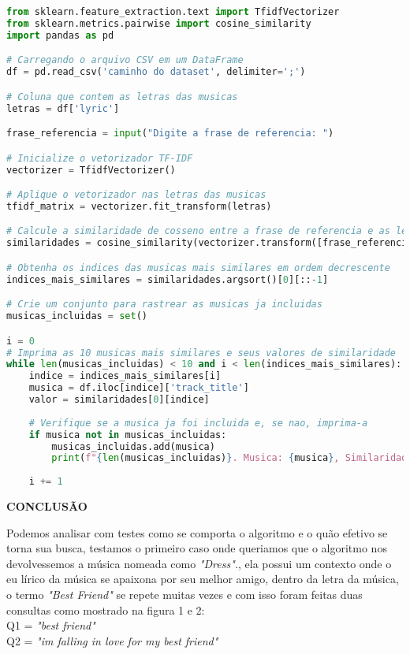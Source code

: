 \documentclass[a4paper,12pt]{article}
\begin{document}
\begin{lstlisting}[language=python, caption=Código referente ao cálculo do Angulo entre Vetores]
from sklearn.feature_extraction.text import TfidfVectorizer
from sklearn.metrics.pairwise import cosine_similarity
import pandas as pd

# Carregando o arquivo CSV em um DataFrame
df = pd.read_csv('caminho do dataset', delimiter=';')

# Coluna que contem as letras das musicas
letras = df['lyric']  

frase_referencia = input("Digite a frase de referencia: ")

# Inicialize o vetorizador TF-IDF
vectorizer = TfidfVectorizer()

# Aplique o vetorizador nas letras das musicas
tfidf_matrix = vectorizer.fit_transform(letras)

# Calcule a similaridade de cosseno entre a frase de referencia e as letras das musicas
similaridades = cosine_similarity(vectorizer.transform([frase_referencia]), tfidf_matrix)

# Obtenha os indices das musicas mais similares em ordem decrescente
indices_mais_similares = similaridades.argsort()[0][::-1]

# Crie um conjunto para rastrear as musicas ja incluidas
musicas_incluidas = set()

i = 0
# Imprima as 10 musicas mais similares e seus valores de similaridade 
while len(musicas_incluidas) < 10 and i < len(indices_mais_similares):
    indice = indices_mais_similares[i]
    musica = df.iloc[indice]['track_title']
    valor = similaridades[0][indice]
    
    # Verifique se a musica ja foi incluida e, se nao, imprima-a
    if musica not in musicas_incluidas:
        musicas_incluidas.add(musica)
        print(f"{len(musicas_incluidas)}. Musica: {musica}, Similaridade (Cosseno): {valor}")
    
    i += 1

\end{lstlisting}


\pagebreak


\begin{center}
\textbf{CONCLUSÃO}    
\end{center}

Podemos analisar com testes como se comporta o algoritmo e o quão efetivo se torna sua busca, testamos o primeiro caso onde queriamos que o algoritmo nos devolvessemos a música nomeada como \textit{"Dress".}, ela possui um contexto onde o eu lírico da música se apaixona por seu melhor amigo, dentro da letra da música, o termo \textit{"Best Friend"} se repete muitas vezes e com isso foram feitas duas consultas como mostrado na figura 1 e 2:\\
Q1 = \textit{"best friend"}\\
Q2 = \textit{"im falling in love for my best friend"} \\
\end{document}
